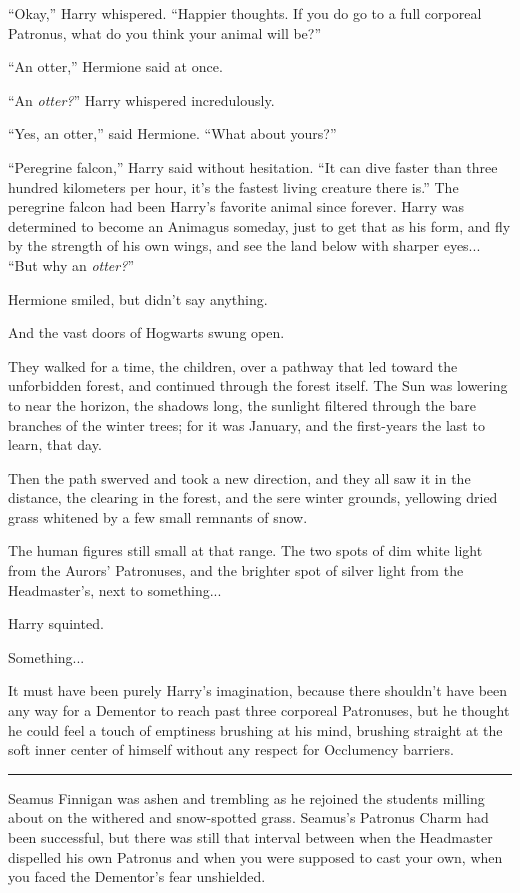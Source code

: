 ``Okay,'' Harry whispered. ``Happier thoughts. If you do go to a full corporeal Patronus, what do you think your animal will be?''

``An otter,'' Hermione said at once.

``An \emph{otter?}'' Harry whispered incredulously.

``Yes, an otter,'' said Hermione. ``What about yours?''

``Peregrine falcon,'' Harry said without hesitation. ``It can dive faster than three hundred kilometers per hour, it's the fastest living creature there is.'' The peregrine falcon had been Harry's favorite animal since forever. Harry was determined to become an Animagus someday, just to get that as his form, and fly by the strength of his own wings, and see the land below with sharper eyes... ``But why an \emph{otter?}''

Hermione smiled, but didn't say anything.

And the vast doors of Hogwarts swung open.

They walked for a time, the children, over a pathway that led toward the unforbidden forest, and continued through the forest itself. The Sun was lowering to near the horizon, the shadows long, the sunlight filtered through the bare branches of the winter trees; for it was January, and the first-years the last to learn, that day.

Then the path swerved and took a new direction, and they all saw it in the distance, the clearing in the forest, and the sere winter grounds, yellowing dried grass whitened by a few small remnants of snow.

The human figures still small at that range. The two spots of dim white light from the Aurors' Patronuses, and the brighter spot of silver light from the Headmaster's, next to something...

Harry squinted.

Something...

It must have been purely Harry's imagination, because there shouldn't have been any way for a Dementor to reach past three corporeal Patronuses, but he thought he could feel a touch of emptiness brushing at his mind, brushing straight at the soft inner center of himself without any respect for Occlumency barriers.

\begin{center}\rule{3in}{0.4pt}\end{center}

Seamus Finnigan was ashen and trembling as he rejoined the students milling about on the withered and snow-spotted grass. Seamus's Patronus Charm had been successful, but there was still that interval between when the Headmaster dispelled his own Patronus and when you were supposed to cast your own, when you faced the Dementor's fear unshielded.

